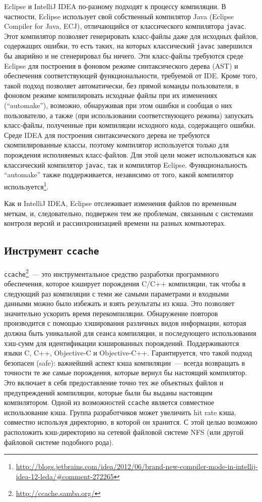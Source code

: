 Eclipse и IntelliJ IDEA по-разному подходят к процессу компиляции. В частности, Eclipse использует свой собственный компилятор Java (Eclipse Compiler for Java, ECJ), отличающийся от классического компилятора \texttt{javac}. Этот компилятор позволяет генерировать класс-файлы даже для исходных файлов, содержащих ошибки, то есть таких, на которых классический \texttt{javac} завершился бы аварийно и не сгенерировал бы ничего. Эти класс-файлы требуются среде Eclipse для построения в фоновом режиме синтаксического дерева (AST) и обеспечения соответствующей функциональности, требуемой от IDE. Кроме того, такой подход позволяет автоматически, без прямой команды пользователя, в фоновом режиме компилировать исходные файлы при их изменениях (``automake''), возможно, обнаруживая при этом ошибки и сообщая о них пользователю, а также (при использовании соответствующего режима) запускать класс-файлы, полученные при компиляции исходного кода, содержащего ошибки.
Среде IDEA для построения синтаксического дерева не требуются скомпилированные классы, поэтому компилятор используется только для порождения исполняемых класс-файлов. Для этой цели может использоваться как классический компилятор \texttt{javac}, так и компилятор Eclipse. Функциональность ``automake'' также поддерживается, независимо от того, какой компилятор используется\footnote{\url{http://blogs.jetbrains.com/idea/2012/06/brand-new-compiler-mode-in-intellij-idea-12-leda/\#comment-272265}}.

Как и IntelliJ IDEA, Eclipse отслеживает изменения файлов по временным меткам, и, следовательно, подвержен тем же проблемам, связанным с системами контроля версий и рассинхронизацией времени на разных компьютерах.

\subsection{Инструмент \texttt{ccache}}
\texttt{ccache}\footnote{\url{http://ccache.samba.org/}}~--- это инструментальное средство разработки программного обеспечения, которое кэширует порождения C/C++ компиляции, так чтобы в следующий раз компиляции с теми же самыми параметрами и входными данными можно было избежать и взять результаты из кэша. Это позволяет значительно ускорить время перекомпиляции. Обнаружение повторов производится с помощью хэширования различных видов информации, которая должна быть уникальной для сеанса компиляции, и последующего использования хэш-сумм для идентификации кэшированных порождений. Поддерживаются языки C, C++, Objective-C и Objective-C++. Гарантируется, что такой подход безопасен (safe): важнейший аспект кэша компиляции~--- всегда возвращать в точности те же самые порождения, которые вернул бы настоящий компилятор. Это включает в себя предоставление точно тех же объектных файлов и предупреждений компиляции, которые были бы выданы настоящим компилятором.
Одной из возможностей \texttt{ccache} является совместное использование кэша. Группа разработчиков может увеличить hit rate кэша, совместно используя директорию, в которой он хранится. С этой целью возможно расположить кэш-директорию на сетевой файловой системе NFS (или другой файловой системе подобного рода).

